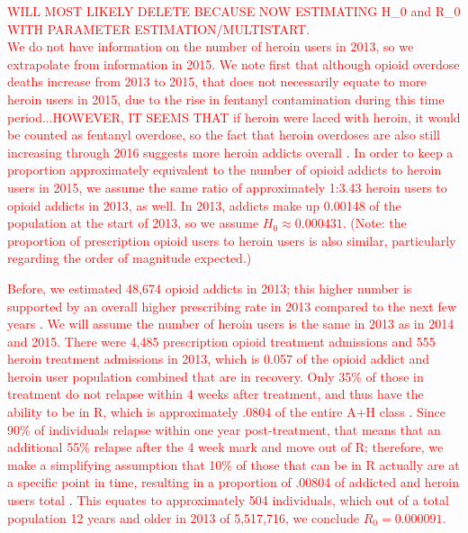 \documentclass[12pt]{article}
\begin{document}
\textcolor{red}{WILL MOST LIKELY DELETE BECAUSE NOW ESTIMATING H\_0 and R\_0 WITH PARAMETER ESTIMATION/MULTISTART. \\
 We do not have information on the number of heroin users in 2013, so we extrapolate from information in 2015. We note first that although opioid overdose deaths increase from 2013 to 2015, that does not necessarily equate to more heroin users in 2015, due to the rise in fentanyl contamination during this time period...HOWEVER, IT SEEMS THAT if heroin were laced with heroin, it would be counted as fentanyl overdose, so the fact that heroin overdoses are also still increasing through 2016 suggests more heroin addicts overall} \cite{CDC4}. \textcolor{red}{In order to keep a proportion approximately equivalent to the number of opioid addicts to heroin users in 2015, we assume the same ratio of approximately 1:3.43 heroin users to opioid addicts in 2013, as well. In 2013, addicts make up 0.00148 of the population at the start of 2013, so we assume $H_0 \approx 0.000431.$ (Note: the proportion of prescription opioid users to heroin users is also similar, particularly regarding the order of magnitude expected.)}

\textcolor{red}{Before, we estimated 48,674 opioid addicts in 2013; this higher number is supported by an overall higher prescribing rate in 2013 compared to the next few years} \cite{CDC7}.
\textcolor{red}{We will assume the number of heroin users is the same in 2013 as in 2014 and 2015. There were 4,485 prescription opioid treatment admissions and 555 heroin treatment admissions in 2013, which is 0.057 of the opioid addict and heroin user population combined that are in recovery. Only 35\% of those in treatment do not relapse within 4 weeks after treatment, and thus have the ability to be in R, which is approximately .0804 of the entire A+H class }\cite{Bailey}.
\textcolor{red}{Since 90\% of individuals relapse within one year post-treatment, that means that an additional 55\% relapse after the 4 week mark and move out of R; therefore, we make a simplifying assumption that 10\% of those that can be in R actually are at a specific point in time, resulting in a proportion of .00804 of addicted and heroin users total} \cite{Bailey}. \textcolor{red}{This equates to approximately 504 individuals, which out of a total population 12 years and older in 2013 of 5,517,716, we conclude $R_0=0.000091.$} \\
\end{document}
